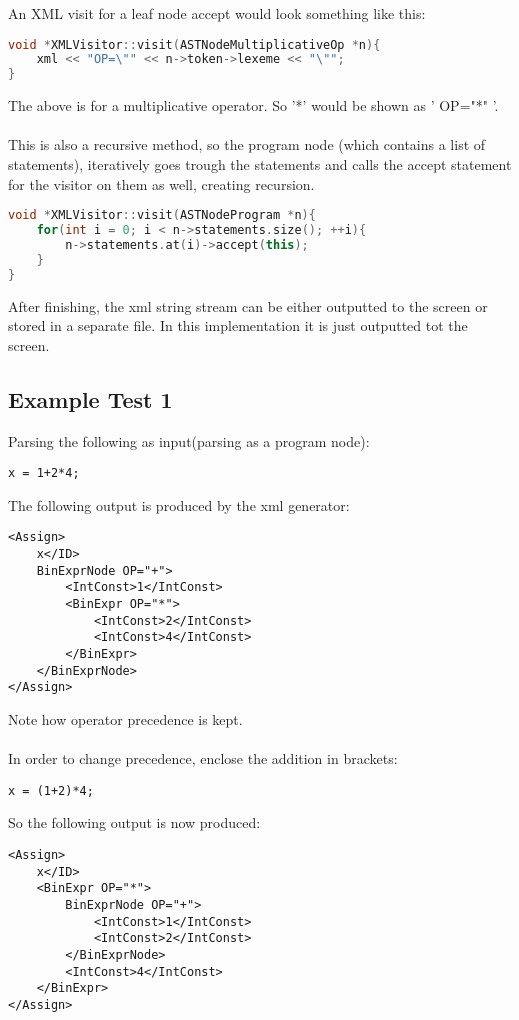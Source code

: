 An XML visit for a leaf node accept would look something like this:
\begin{lstlisting}[language=C++]
void *XMLVisitor::visit(ASTNodeMultiplicativeOp *n){
	xml << "OP=\"" << n->token->lexeme << "\"";
}
\end{lstlisting}
The above is for a multiplicative operator. So '*' would be shown as ' OP="*" '.
\\\\
This is also a recursive method, so the program node (which contains a list of statements), iteratively goes trough the statements and calls the accept statement for the visitor on them as well, creating recursion.

\begin{lstlisting}[language=C++]
void *XMLVisitor::visit(ASTNodeProgram *n){
	for(int i = 0; i < n->statements.size(); ++i){
		n->statements.at(i)->accept(this);
	}
}
\end{lstlisting}

After finishing, the xml string stream can be either outputted to the screen or stored in a separate file. In this implementation it is just outputted tot the screen.

\subsection{Example Test 1}
Parsing the following as input(parsing as a program node):
\begin{lstlisting}
x = 1+2*4;
\end{lstlisting}

The following output is produced by the xml generator:
\begin{lstlisting}
<Assign>
	x</ID>
	BinExprNode OP="+">
		<IntConst>1</IntConst>
		<BinExpr OP="*">
			<IntConst>2</IntConst>
			<IntConst>4</IntConst>
		</BinExpr>
	</BinExprNode>
</Assign>
\end{lstlisting}
Note how operator precedence is kept.
\\\\
In order to change precedence, enclose the addition in brackets:
\begin{lstlisting}
x = (1+2)*4;
\end{lstlisting}

So the following output is now produced:
\begin{lstlisting}
<Assign>
	x</ID>
	<BinExpr OP="*">
		BinExprNode OP="+">
			<IntConst>1</IntConst>
			<IntConst>2</IntConst>
		</BinExprNode>
		<IntConst>4</IntConst>
	</BinExpr>
</Assign>
\end{lstlisting}

